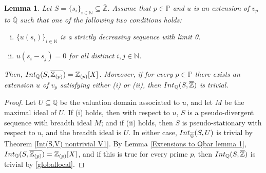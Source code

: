 \documentclass{article}
\newtheorem{Lem}[equation]{Lemma}
\theoremstyle{definition}\newtheorem{Def}[equation]{Definition}
\theoremstyle{definition}\newtheorem{Ques}[equation]{Question}
\theoremstyle{definition}\newtheorem{Conj}[equation]{Conjecture}
\theoremstyle{definition}\newtheorem{Not}[equation]{Notation}
\newcommand{\N}{\mathbb{N}}
\newcommand{\Q}{\mathbb{Q}}
\newcommand{\oQ}{\overline{\Q}}
\newcommand{\oZ}{\overline{\Z}}
\newcommand{\Z}{\mathbb{Z}}
\newcommand{\Int}{\textnormal{Int}}
\newcommand{\IntQ}{\Int_{\Q}}
\newcommand{\PP}{\mathbb{P}}
\numberwithin{equation}{section}
\begin{document}
\begin{Lem}\label{Extensions to Qbar lemma 2}
Let $S =\{s_i\}_{i \in \N} \subseteq \oZ$. Assume that $p \in \PP$ and $u$ is an extension of $v_p$ to $\oQ$ such that one of the following two conditions holds:
\begin{enumerate}[(i)]
\item $\{u(s_i)\}_{i \in \N}$ is a strictly decreasing sequence with limit 0.
\item $u(s_i-s_j)=0$ for all distinct $i, j \in \N$.
\end{enumerate}
Then, $\IntQ(S,\overline{\Z_{(p)}}) = \Z_{(p)}[X]$. Moreover, if for every $p \in \PP$ there exists an extension $u$ of $v_p$ satisfying either (i) or (ii), then $\IntQ(S,\oZ)$ is trivial.
\end{Lem}
\begin{proof}
Let $U \subseteq \oQ$ be the valuation domain associated to $u$, and let $M$ be the maximal ideal of $U$. If (i) holds, then with respect to $u$, $S$ is a pseudo-divergent sequence with breadth ideal $M$; and if (ii) holds, then $S$ is pseudo-stationary with respect to $u$, and the breadth ideal is $U$. In either case, $\Int_{\oQ}(S,U)$ is trivial by Theorem \ref{Int(S,V) nontrivial V1}. By Lemma \ref{Extensions to Qbar lemma 1}, $\IntQ(S,\overline{\Z_{(p)}}) = \Z_{(p)}[X]$, and if this is true for every prime $p$, then $\IntQ(S,\oZ)$ is trivial by \eqref{globallocal}.
\end{proof}
\end{document}
